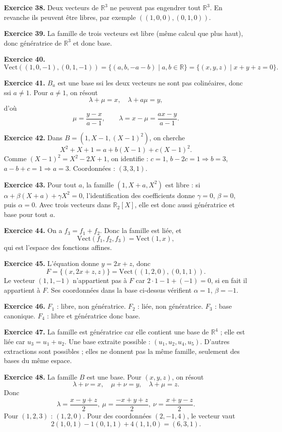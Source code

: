 \documentclass[11pt,a4paper]{article}
\newcommand{\R}{\mathbb R}
\newcommand{\Vect}{\mathrm{Vect}}
\begin{document}
\textbf{Exercice 38.} Deux vecteurs de $\R^3$ ne peuvent pas engendrer tout $\R^3$. En revanche ils peuvent être libres, par exemple $((1,0,0),(0,1,0))$.

\textbf{Exercice 39.} La famille de trois vecteurs est libre (même calcul que plus haut), donc génératrice de $\R^3$ et donc base.

\textbf{Exercice 40.} 
\[\Vect((1,0,-1),(0,1,-1))=\{(a,b,-a-b)\mid a,b\in\R\}=\{(x,y,z)\mid x+y+z=0\}.\]

\textbf{Exercice 41.} $B_a$ est une base ssi les deux vecteurs ne sont pas colinéaires, donc ssi $a\neq 1$. Pour $a\neq 1$, on résout
\[\lambda+\mu=x,\quad \lambda+a\mu=y,\]
d'où
\[\mu=\frac{y-x}{a-1},\qquad \lambda=x-\mu=\frac{ax-y}{a-1}.\]

\textbf{Exercice 42.} Dans $B=(1,X-1,(X-1)^2)$, on cherche
\[X^2+X+1=a+b(X-1)+c(X-1)^2.
\]
Comme $(X-1)^2=X^2-2X+1$, on identifie : $c=1$, $b-2c=1\Rightarrow b=3$, $a-b+c=1\Rightarrow a=3$. Coordonnées : $(3,3,1)$.

\textbf{Exercice 43.} Pour tout $a$, la famille $(1,X+a,X^2)$ est libre : si $\alpha+\beta(X+a)+\gamma X^2=0$, l'identification des coefficients donne $\gamma=0$, $\beta=0$, puis $\alpha=0$. Avec trois vecteurs dans $\R_2[X]$, elle est donc aussi génératrice et base pour tout $a$.

\textbf{Exercice 44.} On a $f_3=f_1+f_2$. Donc la famille est liée, et
\[\Vect(f_1,f_2,f_3)=\Vect(1,x),\]
qui est l'espace des fonctions affines.

\textbf{Exercice 45.} L'équation donne $y=2x+z$, donc
\[F=\{(x,2x+z,z)\}=\Vect((1,2,0),(0,1,1)).\]
Le vecteur $(1,1,-1)$ n'appartient pas à $F$ car $2\cdot1-1+(-1)=0$, si en fait il appartient à $F$. Ses coordonnées dans la base ci-dessus vérifient $\alpha=1$, $\beta=-1$.

\textbf{Exercice 46.} $F_1$ : libre, non génératrice. $F_2$ : liée, non génératrice. $F_3$ : base canonique. $F_4$ : libre et génératrice donc base.

\textbf{Exercice 47.} La famille est génératrice car elle contient une base de $\R^4$ ; elle est liée car $u_3=u_1+u_2$. Une base extraite possible : $(u_1,u_2,u_4,u_5)$. D'autres extractions sont possibles ; elles ne donnent pas la même famille, seulement des bases du même espace.

\textbf{Exercice 48.} La famille $B$ est une base. Pour $(x,y,z)$, on résout
\[\lambda+\nu=x,\quad \mu+\nu=y,\quad \lambda+\mu=z.\]
Donc
\[\lambda=\frac{x-y+z}{2},\ \mu=\frac{-x+y+z}{2},\ \nu=\frac{x+y-z}{2}.\]
Pour $(1,2,3)$ : $(1,2,0)$. Pour des coordonnées $(2,-1,4)$, le vecteur vaut
\[2(1,0,1)-1(0,1,1)+4(1,1,0)=(6,3,1).\]
\end{document}
